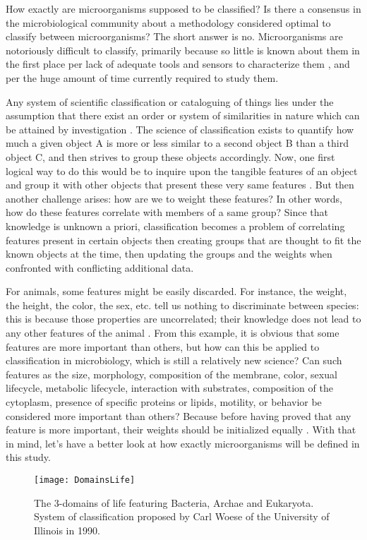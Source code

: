 How exactly are microorganisms supposed to be classified? Is there a consensus in the microbiological community about a methodology considered optimal to classify between microorganisms? The short answer is no. Microorganisms are notoriously difficult to classify, primarily because so little is known about them in the first place per lack of adequate tools and sensors to characterize them \cite{Hutchins2019}, and per the huge amount of time currently required to study them. \par

Any system of scientific classification or cataloguing of things lies under the assumption that there exist an order or system of similarities in nature which can be attained by investigation \cite{Sneath1957}. The science of classification exists to quantify how much a given object A is more or less similar to a second object B than a third object C, and then strives to group these objects accordingly. Now, one first logical way to do this would be to inquire upon the tangible features of an object and group it with other objects that present these very same features \cite{Sneath1957}. But then another challenge arises: how are we to weight these features? In other words, how do these features correlate with members of a same group? Since that knowledge is unknown a priori, classification becomes a problem of correlating features present in certain objects then creating groups that are thought to fit the known objects at the time, then updating the groups and the weights when confronted with conflicting additional data. \par

For animals, some features might be easily discarded. For instance, the weight, the height, the color, the sex, etc. tell us nothing to discriminate between species: this is because those properties are uncorrelated; their knowledge does not lead to any other features of the animal \cite{Sneath1957}. From this example, it is obvious that some features are more important than others, but how can this be applied to classification in microbiology, which is still a relatively new science? Can such features as the size, morphology, composition of the membrane, color, sexual lifecycle, metabolic lifecycle, interaction with substrates, composition of the cytoplasm, presence of specific proteins or lipids, motility, or behavior be considered more important than others? Because before having proved that any feature is more important, their weights should be initialized equally \cite{Sneath1957}. With that in mind, let’s have a better look at how exactly microorganisms will be defined in this study. \par
\begin{figure}[ht]
    \centering
    \texttt{[image: DomainsLife]}
    \caption{The 3-domains of life featuring Bacteria, Archae and Eukaryota. System of classification proposed by Carl Woese of the University of Illinois in 1990.}
    \label{fig:DomainsLife}
\end{figure}

